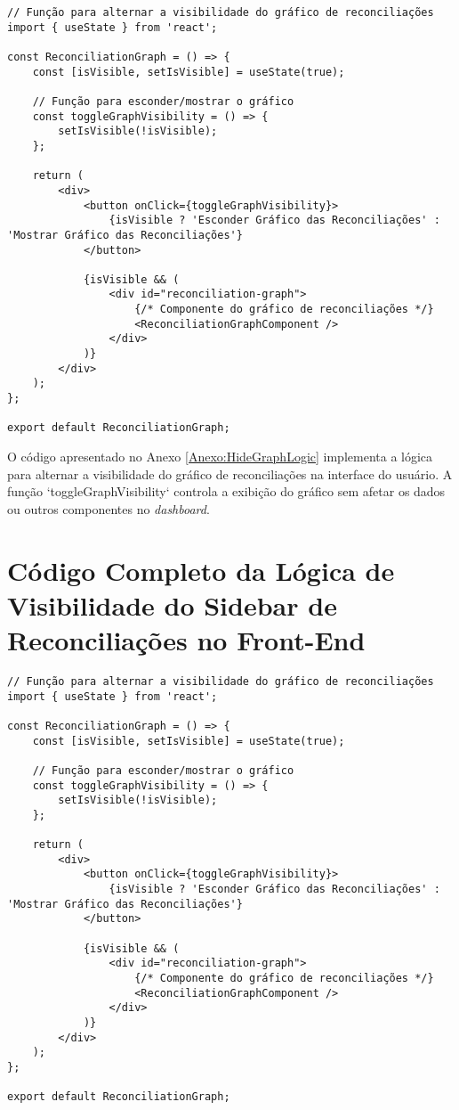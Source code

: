 \begin{verbatim}
// Função para alternar a visibilidade do gráfico de reconciliações
import { useState } from 'react';

const ReconciliationGraph = () => {
    const [isVisible, setIsVisible] = useState(true);

    // Função para esconder/mostrar o gráfico
    const toggleGraphVisibility = () => {
        setIsVisible(!isVisible);
    };

    return (
        <div>
            <button onClick={toggleGraphVisibility}>
                {isVisible ? 'Esconder Gráfico das Reconciliações' : 'Mostrar Gráfico das Reconciliações'}
            </button>

            {isVisible && (
                <div id="reconciliation-graph">
                    {/* Componente do gráfico de reconciliações */}
                    <ReconciliationGraphComponent />
                </div>
            )}
        </div>
    );
};

export default ReconciliationGraph;
\end{verbatim}

O código apresentado no Anexo \ref{Anexo:HideGraphLogic} implementa a lógica para alternar a visibilidade do gráfico de reconciliações na interface do usuário. A função `toggleGraphVisibility` controla a exibição do gráfico sem afetar os dados ou outros componentes no \textit{dashboard}.


\chapter{Código Completo da Lógica de Visibilidade do Sidebar de Reconciliações no Front-End}
\label{Anexo:HideSidebarLogic}

\begin{verbatim}
// Função para alternar a visibilidade do gráfico de reconciliações
import { useState } from 'react';

const ReconciliationGraph = () => {
    const [isVisible, setIsVisible] = useState(true);

    // Função para esconder/mostrar o gráfico
    const toggleGraphVisibility = () => {
        setIsVisible(!isVisible);
    };

    return (
        <div>
            <button onClick={toggleGraphVisibility}>
                {isVisible ? 'Esconder Gráfico das Reconciliações' : 'Mostrar Gráfico das Reconciliações'}
            </button>

            {isVisible && (
                <div id="reconciliation-graph">
                    {/* Componente do gráfico de reconciliações */}
                    <ReconciliationGraphComponent />
                </div>
            )}
        </div>
    );
};

export default ReconciliationGraph;
\end{verbatim}

